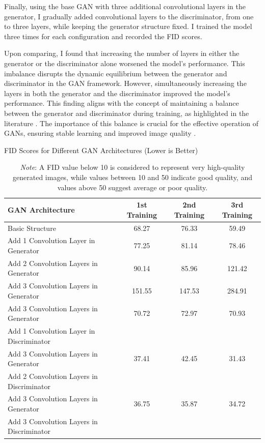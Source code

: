 Finally, using the base GAN with three additional convolutional layers in the generator, I gradually added convolutional layers to the discriminator, from one to three layers, while keeping the generator structure fixed. I trained the model three times for each configuration and recorded the FID scores.

Upon comparing, I found that increasing the number of layers in either the generator or the discriminator alone worsened the model’s performance. This imbalance disrupts the dynamic equilibrium between the generator and discriminator in the GAN framework. However, simultaneously increasing the layers in both the generator and the discriminator improved the model’s performance. This finding aligns with the concept of maintaining a balance between the generator and discriminator during training, as highlighted in the literature \citep{10.48550/arxiv.1703.10717}. The importance of this balance is crucial for the effective operation of GANs, ensuring stable learning and improved image quality \citep{10.48550/arxiv.2002.02112}.    

\begin{table}[h]
    \centering
    \caption{FID Scores for Different GAN Architectures (Lower is Better)}
    \begin{tabular}{|l|c|c|c|}
      \hline
      \textbf{GAN Architecture} & \textbf{1st Training} & \textbf{2nd Training} & \textbf{3rd Training} \\
      \hline
      Basic Structure & 68.27 & 76.33 & 59.49 \\
      \hline
      Add 1 Convolution Layer in Generator & 77.25 & 81.14 & 78.46 \\
      \hline
      Add 2 Convolution Layers in Generator & 90.14 & 85.96 & 121.42 \\
      \hline
      Add 3 Convolution Layers in Generator & 151.55 & 147.53 & 284.91 \\
      \hline
      \multicolumn{1}{|l|}{Add 3 Convolution Layers in Generator} & 70.72 & 72.97 & 70.93 \\
      \multicolumn{1}{|l|}{Add 1 Convolution Layer in Discriminator} & & & \\
      \hline
      \multicolumn{1}{|l|}{Add 3 Convolution Layers in Generator} & 37.41 & 42.45 & 31.43 \\
      \multicolumn{1}{|l|}{Add 2 Convolution Layers in Discriminator} & & & \\
      \hline
      \multicolumn{1}{|l|}{Add 3 Convolution Layers in Generator} & 36.75 & 35.87 & 34.72 \\
      \multicolumn{1}{|l|}{Add 3 Convolution Layers in Discriminator} & & & \\
      \hline
    \end{tabular}
    \vspace{2mm}
    \caption*{\textit{Note}: A FID value below 10 is considered to represent very high-quality generated images, 
    while values between 10 and 50 indicate good quality, and values above 50 suggest average or poor quality.}
\end{table}

